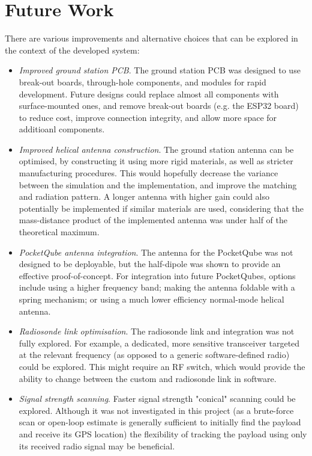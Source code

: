 \section{Future Work}\label{sec:future_work}

There are various improvements and alternative choices that can be explored in the context of the developed system:
\begin{itemize}
    \item \textit{Improved ground station PCB}. The ground station PCB was designed to use break-out boards, through-hole components, and modules for rapid development. Future designs could replace almost all components with surface-mounted ones, and remove break-out boards (e.g. the ESP32 board) to reduce cost, improve connection integrity, and allow more space for additioanl components.
    \item \textit{Improved helical antenna construction}. The ground station antenna can be optimised, by constructing it using more rigid materials, as well as stricter manufacturing procedures. This would hopefully decrease the variance between the simulation and the implementation, and improve the matching and radiation pattern. A longer antenna with higher gain could also potentially be implemented if similar materials are used, considering that the mass-distance product of the implemented antenna was under half of the theoretical maximum.
    \item \textit{PocketQube antenna integration}. The antenna for the PocketQube was not designed to be deployable, but the half-dipole was shown to provide an effective proof-of-concept. For integration into future PocketQubes, options include using a higher frequency band; making the antenna foldable with a spring mechanism; or using a much lower efficiency normal-mode helical antenna.
    \item \textit{Radiosonde link optimisation}. The radiosonde link and integration was not fully explored. For example, a dedicated, more sensitive transceiver targeted at the relevant frequency (as opposed to a generic software-defined radio) could be explored. This might require an RF switch, which would provide the ability to change between the custom and radiosonde link in software.
    \item \textit{Signal strength scanning}. Faster signal strength "conical" scanning could be explored. Although it was not investigated in this project (as a brute-force scan or open-loop estimate is generally sufficient to initially find the payload and receive its GPS location) the flexibility of tracking the payload using only its received radio signal may be beneficial.
\end{itemize}